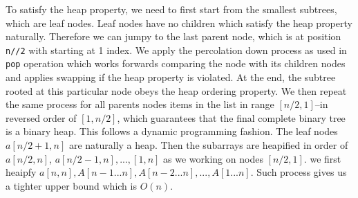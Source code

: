 \documentclass[../main.tex]{subfiles}
\begin{document}
To satisfy the heap property, we need to first start from the smallest subtrees, which are leaf nodes. Leaf nodes  have no children which satisfy the heap property naturally. Therefore we can jumpy to the last parent node, which is at position \texttt{n//2} with starting at 1 index. We apply the percolation down process as used in \texttt{pop}  operation which works forwards comparing the node with its children nodes and applies swapping if the heap property is violated. At the end, the subtree rooted at this particular node obeys the heap ordering property. We then repeat the same process for all parents nodes items in the list in range $[n/2, 1]$--in reversed order of $[1, n/2]$, which guarantees that the final complete binary tree is a binary heap. This follows a dynamic programming fashion.  The leaf nodes $a[n/2+1, n]$ are naturally a heap. Then the subarrays are heapified in order of  $a[n/2, n]$, $a[n/2-1, n], ..., [1, n]$ as we working on nodes $[n/2, 1]$.  we first heaipfy $a[n, n], A[n-1...n], A[n-2...n], ..., A[1...n]$.  Such process gives us a tighter upper bound which is $O(n)$. 
\end{document}
